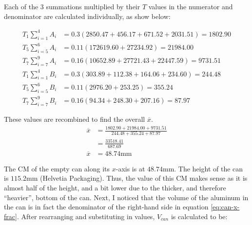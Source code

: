 \documentclass[11pt]{article}
\begin{document}
    Each of the $3$ summations multiplied by their $T$ values in the numerator and denominator are calculated individually, as show below:

    \begin{minipage}{.45\linewidth}
        {\footnotesize\begin{align*}
            T_1 \sum_{i=1}^4 A_i &= 0.3(2850.47 + 456.17 + 671.52 + 2031.51) = 1802.90 \\
            T_5 \sum_{i=5}^6 A_i &= 0.11(172619.60 + 27234.92) = 21984.00 \\
            T_7 \sum_{i=7}^9 A_i &= 0.16(10652.89 + 27721.43 + 22447.59) = 9731.51 \\
            T_1 \sum_{i=1}^4 B_i &= 0.3(303.89 + 112.38 + 164.06 + 234.60) = 244.48 \\
            T_5 \sum_{i=5}^6 B_i &= 0.11(2976.20 + 253.25) = 355.24 \\
            T_7 \sum_{i=7}^9 B_i &= 0.16(94.34 + 248.30 + 207.16) = 87.97
        \end{align*}}
    \end{minipage}%
    \begin{minipage}{.4\linewidth}
        \vspace{60pt}
        These values are recombined to find the overall $\overline{x}$.
        {\footnotesize\begin{align*}
            \overline{x} &= \frac{1802.90 + 21984.00 + 9731.51}{244.48 + 355.24 + 87.97} \\
            &= \frac{33518.41}{687.69} \\
            \overline{x} &= 48.74 \mathrm{mm}
        \end{align*}}
    \end{minipage}
    \vspace{16pt}

    The CM of the empty can along its $x$-axis is at $48.74 \mathrm{mm}$. The height of the can is $115.2 \mathrm{mm}$ (Helvetia Packaging). Thus, the value of this CM makes sense as it is almost half of the height, and a bit lower due to the thicker, and therefore ``heavier'', bottom of the can. Next, I noticed that the volume of the aluminum in the can is in fact the denominator of the right-hand side in equation \eqref{eq:can-x-frac}. After rearranging and substituting in values, $V_{can}$ is calculated to be:
\end{document}

